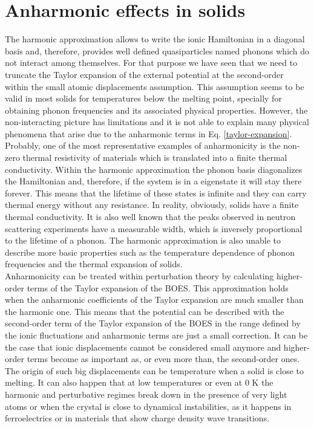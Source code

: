\section{Anharmonic effects in solids}
The harmonic approximation allows to write the ionic Hamiltonian in a diagonal basis and, therefore, provides well defined quasiparticles named phonons which do not interact among themselves. For that purpose 
we have seen that we need to truncate the Taylor expansion of the external potential at the second-order within the small atomic displacements assumption. This assumption seems to be valid in most solids 
for temperatures below the melting point, specially for obtaining phonon frequencies and its associated physical properties\cite{born1954dynamical}. However, the non-interacting picture has limitations and it 
is not able to explain many physical phenomena that arise due to the anharmonic terms in Eq. \ref{taylor-expansion}. Probably, one of the most representative examples of anharmonicity is the non-zero thermal 
resistivity of materials which is translated into a finite thermal conductivity. Within the harmonic approximation the phonon basis diagonalizes the Hamiltonian and, therefore, if the system is in a eigenstate 
it will stay there forever. This means that the lifetime of these states is infinite and they can carry thermal energy without any resistance. In reality, obviously, solids have a finite thermal conductivity. 
It is also well known that the peaks observed in neutron scattering experiments have a measurable width, which is inversely proportional to the lifetime of a phonon. The harmonic approximation is also unable 
to describe more basic properties such as the temperature dependence of phonon frequencies and the thermal expansion of solids. \\ 

Anharmonicity can be treated within perturbation theory by calculating higher-order terms of the Taylor expansion of the BOES. This approximation holds when the anharmonic coefficients of the Taylor expansion 
are much smaller than the harmonic one. This means that the potential can be described with the second-order term of the Taylor expansion of the BOES in the range defined by the ionic fluctuations and anharmonic 
terms are just a small correction. It can be the case that ionic displacements cannot be considered small anymore and higher-order terms become as important as, or even more than, the second-order 
ones. The origin of such big displacements can be temperature when a solid is close to melting. It can also happen that at low temperatures or even at $0$ K the harmonic and perturbative regimes break down in the 
presence of very light atoms\cite{borinaga2017anharmonicity} or when the crystal is close to dynamical instabilities, as it happens in 
ferroelectrics\cite{ribeiro2018strong,zhang2011anomalous} or in materials that show charge density wave transitions\cite{kidd2002electron,leroux2015strong}. \\

